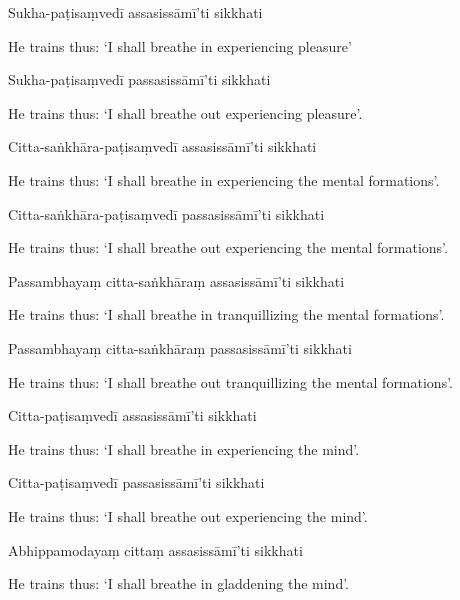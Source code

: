 Sukha-paṭisaṃvedī assasissāmī'ti sikkhati

\begin{english}
  He trains thus: `I shall breathe in experiencing pleasure'
\end{english}

Sukha-paṭisaṃvedī passasissāmī'ti sikkhati

\begin{english}
  He trains thus: `I shall breathe out experiencing pleasure'.
\end{english}

Citta-saṅkhāra-paṭisaṃvedī assasissāmī'ti sikkhati

\begin{english}
  He trains thus: `I shall breathe in experiencing the mental formations'.
\end{english}

Citta-saṅkhāra-paṭisaṃvedī passasissāmī'ti sikkhati

\begin{english}
  He trains thus: `I shall breathe out experiencing the mental formations'.
\end{english}

Passambhayaṃ citta-saṅkhāraṃ assasissāmī'ti sikkhati

\begin{english}
  He trains thus: `I shall breathe in tranquillizing the mental formations'.
\end{english}

Passambhayaṃ citta-saṅkhāraṃ passasissāmī'ti sikkhati

\begin{english}
  He trains thus: `I shall breathe out tranquillizing the mental formations'.
\end{english}

Citta-paṭisaṃvedī assasissāmī'ti sikkhati

\begin{english}
  He trains thus: `I shall breathe in experiencing the mind'.
\end{english}

Citta-paṭisaṃvedī passasissāmī'ti sikkhati

\begin{english}
  He trains thus: `I shall breathe out experiencing the mind'.
\end{english}

Abhippamodayaṃ cittaṃ assasissāmī'ti sikkhati

\begin{english}
  He trains thus: `I shall breathe in gladdening the mind'.
\end{english}

